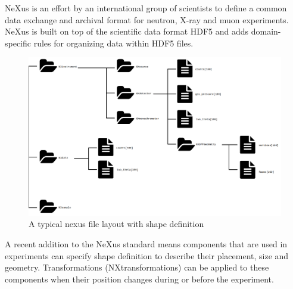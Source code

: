NeXus is an effort by an international group of scientists to define a common data exchange and archival format for neutron, X-ray and muon experiments. NeXus is built on top of the scientific data format HDF5 and adds domain-specific rules for organizing data within HDF5 files.

\begin{figure}
\caption{A typical nexus file layout with shape definition}
\includegraphics[width=\linewidth]{nexusdiagram.png}
\end{figure}

A recent addition to the NeXus standard means components that are used in experiments can specify shape definition to describe their placement, size and geometry. Transformations (NXtransformations) can be applied to these components when their position changes during or before the experiment. 